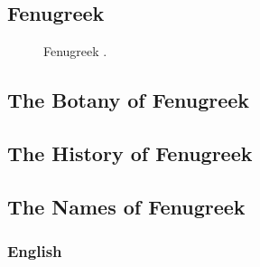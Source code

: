 \subsection{Fenugreek}
\label{sec:fenugreek}



\begin{figure}[!ht]
	\vspace{-4ex}
	\centering
	\hfill
	\caption{Fenugreek \taxon{}.}
	\label{fig:fenugreek_imgs}
\end{figure}

\subsection{The Botany of Fenugreek}

\subsection{The History of Fenugreek}

\subsection{The Names of Fenugreek}

\subsubsection{English}

